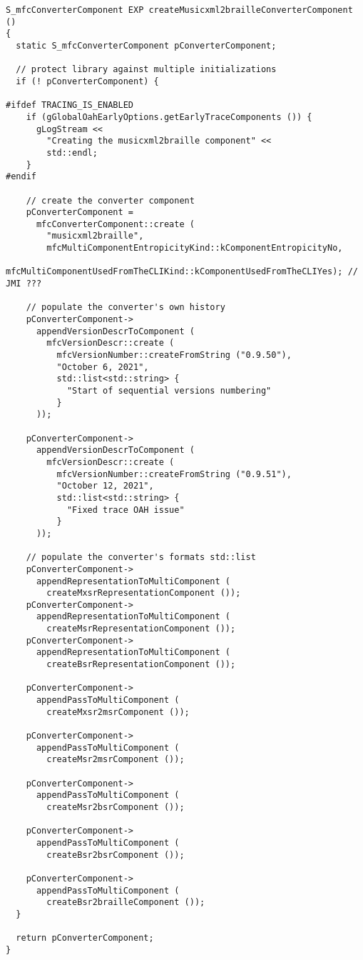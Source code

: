\begin{lstlisting}[language=CPlusPlus]
S_mfcConverterComponent EXP createMusicxml2brailleConverterComponent ()
{
  static S_mfcConverterComponent pConverterComponent;

  // protect library against multiple initializations
  if (! pConverterComponent) {

#ifdef TRACING_IS_ENABLED
    if (gGlobalOahEarlyOptions.getEarlyTraceComponents ()) {
      gLogStream <<
        "Creating the musicxml2braille component" <<
        std::endl;
    }
#endif

    // create the converter component
    pConverterComponent =
      mfcConverterComponent::create (
        "musicxml2braille",
        mfcMultiComponentEntropicityKind::kComponentEntropicityNo,
        mfcMultiComponentUsedFromTheCLIKind::kComponentUsedFromTheCLIYes); // JMI ???

    // populate the converter's own history
    pConverterComponent->
      appendVersionDescrToComponent (
        mfcVersionDescr::create (
          mfcVersionNumber::createFromString ("0.9.50"),
          "October 6, 2021",
          std::list<std::string> {
            "Start of sequential versions numbering"
          }
      ));

    pConverterComponent->
      appendVersionDescrToComponent (
        mfcVersionDescr::create (
          mfcVersionNumber::createFromString ("0.9.51"),
          "October 12, 2021",
          std::list<std::string> {
            "Fixed trace OAH issue"
          }
      ));

    // populate the converter's formats std::list
    pConverterComponent->
      appendRepresentationToMultiComponent (
        createMxsrRepresentationComponent ());
    pConverterComponent->
      appendRepresentationToMultiComponent (
        createMsrRepresentationComponent ());
    pConverterComponent->
      appendRepresentationToMultiComponent (
        createBsrRepresentationComponent ());

    pConverterComponent->
      appendPassToMultiComponent (
        createMxsr2msrComponent ());

    pConverterComponent->
      appendPassToMultiComponent (
        createMsr2msrComponent ());

    pConverterComponent->
      appendPassToMultiComponent (
        createMsr2bsrComponent ());

    pConverterComponent->
      appendPassToMultiComponent (
        createBsr2bsrComponent ());

    pConverterComponent->
      appendPassToMultiComponent (
        createBsr2brailleComponent ());
  }

  return pConverterComponent;
}
\end{lstlisting}


